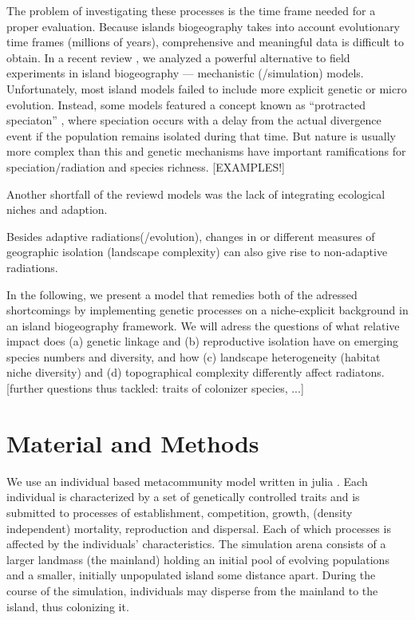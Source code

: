 \documentclass[a4paper]{scrartcl}
\begin{document}

The problem of investigating these processes is the time frame needed for a proper evaluation.
Because islands biogeography takes into account evolutionary time frames (millions of years),
comprehensive and meaningful data is difficult to obtain.
In a recent review \cite{leidinger2017biodiversity}, we analyzed a powerful alternative to field experiments in island biogeography
--- mechanistic (/simulation) models.
Unfortunately, most island models failed to include more explicit genetic or micro evolution.
Instead, some models featured a concept known as ``protracted speciaton'' \cite{rosindellXXX}, where speciation occurs with a delay from the actual
divergence event if the population remains isolated during that time.
But nature is usually more complex than this and genetic mechanisms have important ramifications for speciation/radiation and species richness.
[EXAMPLES!]

Another shortfall of the reviewd models was the lack of integrating ecological niches and adaption.

Besides adaptive radiations(/evolution), changes in or different measures of geographic isolation (landscape complexity) can also give rise to non-adaptive radiations.

In the following, we present a model that remedies both of the adressed shortcomings by implementing genetic processes on a niche-explicit background
in an island biogeography framework.
We will adress the questions of what relative impact does (a) genetic linkage and (b) reproductive isolation have on emerging species numbers and diversity,
and how (c) landscape heterogeneity (habitat niche diversity) and (d) topographical complexity differently affect radiatons.
[further questions thus tackled: traits of colonizer species, ...]




\section{Material and Methods}
We use an individual based metacommunity model written in julia \cite{JULIALANG}.
Each individual is characterized by a set of genetically controlled traits and is submitted to processes of
establishment, competition, growth, (density independent) mortality, reproduction and dispersal.
Each of which processes is affected by the individuals' characteristics.
The simulation arena consists of a larger landmass (the mainland) holding an initial pool of evolving populations and a smaller, initially unpopulated island some distance apart.
During the course of the simulation, individuals may disperse from the mainland to the island, thus colonizing it.
\end{document}
